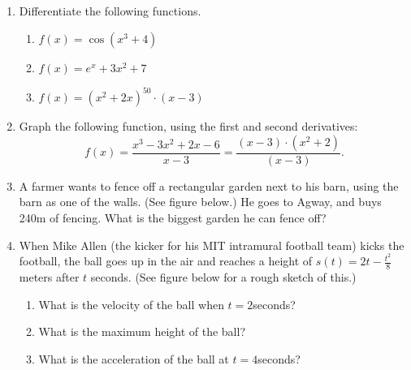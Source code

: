 \documentclass[10pt]{amsart}
\begin{document}
\vfill\pagebreak
\begin{enumerate}

\item Differentiate the following functions.
\begin{enumerate}
\item $f(x)=\cos(x^3+4)$
\vfill
\item $f(x)=e^{x}+3x^2+7$
\vfill
\item $f(x)=(x^2+2x)^{50}\cdot(x-3)$
\end{enumerate}

\vfill\pagebreak

\item Graph the following function, using the first and second
derivatives: 
$$
f(x)=\frac{x^3-3x^2+2x-6}{x-3}=\frac{(x-3)\cdot(x^2+2)}{(x-3)}.
$$

\vfill 

\begin{figure}[h]
\end{figure}



\pagebreak

\item A farmer wants to fence off a rectangular garden next to his
barn, using the barn as one of the walls. (See figure below.)  He goes
to Agway, and buys 240m of fencing.  What is the biggest garden he can 
fence off?

\begin{figure}[h]
\hfill{}
\end{figure}

\vfill\pagebreak

\item When Mike Allen (the kicker for his MIT intramural football
team) kicks the football,
the ball goes up in the air and  reaches a height of
$s(t)=2t-\frac{t^2}{8}$ meters after $t$ seconds. (See figure below
for a rough sketch of this.)

\begin{figure}[h]
\centerline{
}
\end{figure}

\begin{enumerate}
\item What is the velocity of the ball when $t=2$seconds?
\vfill
\item What is the maximum height of the ball?
\vfill
\item What is the acceleration of the ball at $t=4$seconds?
\end{enumerate}



\end{enumerate}
\end{document}
